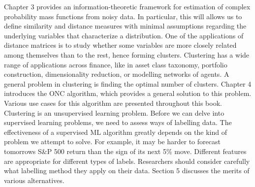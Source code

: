 \documentclass[10pt]{article}[draft]
\begin{document}
		Chapter 3 provides an information-theoretic framework for estimation of complex probability mass functions from noisy data. In particular, this will allows us to define similarity and distance measures with minimal assumptions regarding the underlying variables that characterize a distribution. One of the applications of distance matrices is to study whether some variables are more closely related among themselves than to the rest, hence forming clusters. Clustering has a wide range of applications across finance, like in asset class taxonomy, portfolio construction, dimensionality reduction, or modelling networks of agents. A general problem in clustering is finding the optimal number of clusters. Chapter 4 introduces the ONC algorithm, which provides a general solution to this problem. Various use cases for this algorithm are presented throughout this book. Clustering is an unsupervised learning problem. Before we can delve into supervised learning problems, we need to assess ways of labelling  data. The effectiveness of a supervised ML algorithm greatly depends on the kind of problem we attempt to solve. For example, it may be harder to forecast tomorrows S\&P 500 return than the sign of its next 5\% move. Different features are appropriate for different types of labels. Researchers should consider carefully what labelling method they apply on their data. Section 5 discusses the merits of various alternatives.
		
\end{document}
